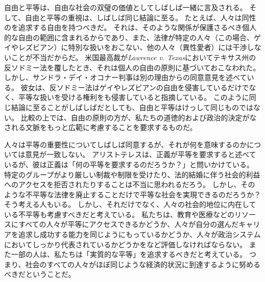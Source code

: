 \documentclass[paper=a4,book,openany]{jlreq}
\begin{document}
自由と平等は、自由な社会の双璧の価値としてしばしば一緒に言及される。
そして、自由と平等の重視は、しばしば同じ結論に至る。
たとえば、人々は同性のを追求する自由を持つべきだ。
それは、そのような関係が保護さるべき個人的な自由の範囲に含まれるからであり、また、法律が特定の人々（この場合、ゲイやレズビアン）に特別な扱いをおこない、他の人々（異性愛者）には干渉しないことが不当だからだ。
米国最高裁が\emph{Lawrence v. Texas}においてテキサス州の反ソドミー法を覆したとき、それは個人の自由の原則に基づいておこなわれた。
しかし、サンドラ・デイ・オコナー判事は別の理由からの同意意見を述べている。
彼女は、反ソドミー法はゲイやレズビアンの自由を侵害しているだけでなく、平等な扱いを受ける権利をも侵害していると指摘している。
このように同じ結論に至ることがしばしばだとしても、自由と平等はけっして同じものではない。
比較の上では、自由の原則の方が、私たちの道徳的および政治的決定がなされる文脈をもっと広範に考慮することを要求するものだ。

人々は平等の重要性についてしばしば同意するが、それが何を意味するのかについては意見が一致しない。
アリストテレスは、正義が平等を要求すると述べているが、彼は正義は「何の平等を要求するのだろうか？」と問いかけている。
特定のグループがより厳しい制裁や制限を受けたり、法的結婚に伴う社会的利益へのアクセスを拒否されたりすることは不当に思われるだろう。
しかし、そのような不平等な法律を廃止することだけで平等な社会を実現できるのだろうか？ そう考える人もいる。
しかし、それだけでなく、人々の社会的地位に内在している不平等も考慮すべきだと考えている。
私たちは、教育や医療などのリソースにすべての人々が平等にアクセスできるかどうか、人々が自分の選んだキャリアを追求し成功する能力を同じようにもっているかどうか、人々が政治システムにおいてしっかり代表されているかどうかをなど評価しなければならない。
また一部の人は、私たちは「実質的な平等」を追求するべきだと考えている。
つまり、社会のすべての人々がほぼ同じような経済的状況に到達するように努めるべきだということだ。
\end{document}
